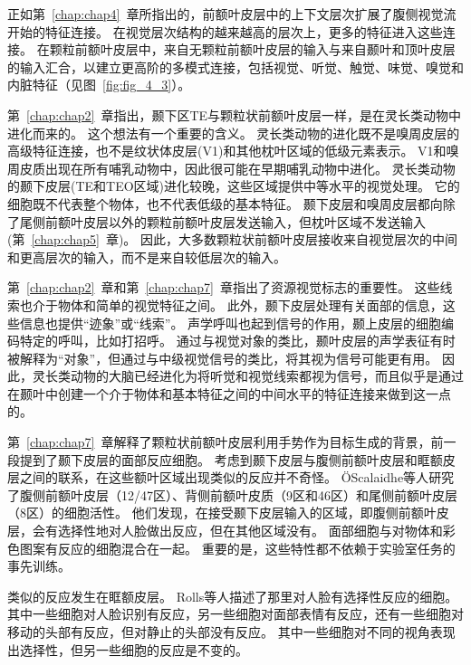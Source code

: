 正如第~\ref{chap:chap4}~章所指出的，前额叶皮层中的上下文层次扩展了腹侧视觉流开始的特征连接\cite{murray2007visual}。
在视觉层次结构的越来越高的层次上，更多的特征进入这些连接。
在颗粒前额叶皮层中，来自无颗粒前额叶皮层的输入与来自颞叶和顶叶皮层的输入汇合，以建立更高阶的多模式连接，包括视觉、听觉、触觉、味觉、嗅觉和内脏特征（见图~\ref{fig:fig_4_3}）。
\par


第~\ref{chap:chap2}~章指出，颞下区TE与颗粒状前额叶皮层一样，是在灵长类动物中进化而来的。
这个想法有一个重要的含义。
灵长类动物的进化既不是嗅周皮层的高级特征连接，也不是纹状体皮层(V1)和其他枕叶区域的低级元素表示。
V1和嗅周皮质出现在所有哺乳动物中，因此很可能在早期哺乳动物中进化。
灵长类动物的颞下皮层(TE和TEO区域)进化较晚，这些区域提供中等水平的视觉处理。
它的细胞既不代表整个物体，也不代表低级的基本特征。
颞下皮层和嗅周皮层都向除了尾侧前额叶皮层以外的颗粒前额叶皮层发送输入，但枕叶区域不发送输入(第~\ref{chap:chap5}~章)。
因此，大多数颗粒状前额叶皮层接收来自视觉层次的中间和更高层次的输入，而不是来自较低层次的输入。
\par


第~\ref{chap:chap2}~章和第~\ref{chap:chap7}~章指出了资源视觉标志的重要性。
这些线索也介于物体和简单的视觉特征之间。
此外，颞下皮层处理有关面部的信息\cite{baylis1987functional,tanaka1991coding}，这些信息也提供“迹象”或“线索”。
声学呼叫也起到信号的作用，颞上皮层的细胞编码特定的呼叫，比如打招呼\cite{rauschecker1995processing}。
通过与视觉对象的类比，颞叶皮层的声学表征有时被解释为“对象”，但通过与中级视觉信号的类比，将其视为信号可能更有用。
因此，灵长类动物的大脑已经进化为将听觉和视觉线索都视为信号，而且似乎是通过在颞叶中创建一个介于物体和基本特征之间的中间水平的特征连接来做到这一点的。
\par


第~\ref{chap:chap7}~章解释了颗粒状前额叶皮层利用手势作为目标生成的背景，前一段提到了颞下皮层的面部反应细胞。
考虑到颞下皮层与腹侧前额叶皮层和眶额皮层之间的联系，在这些额叶区域出现类似的反应并不奇怪。
ÖScalaidhe等人\cite{o1999face}研究了腹侧前额叶皮层（12/47区）、背侧前额叶皮质（9区和46区）和尾侧前额叶皮层（8区）的细胞活性。
他们发现，在接受颞下皮层输入的区域，即腹侧前额叶皮层，会有选择性地对人脸做出反应，但在其他区域没有。
面部细胞与对物体和彩色图案有反应的细胞混合在一起。
重要的是，这些特性都不依赖于实验室任务的事先训练。
\par


类似的反应发生在眶额皮层。
Rolls等人\cite{rolls2006face}描述了那里对人脸有选择性反应的细胞。
其中一些细胞对人脸识别有反应，另一些细胞对面部表情有反应，还有一些细胞对移动的头部有反应，但对静止的头部没有反应。
其中一些细胞对不同的视角表现出选择性，但另一些细胞的反应是不变的。
\par


